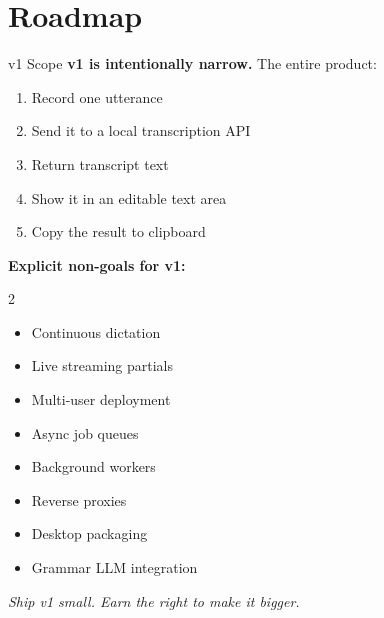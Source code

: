\documentclass{beamer}
\begin{document}
\section{Roadmap}

\begin{frame}{v1 Scope}
    \small
    \textbf{v1 is intentionally narrow.} The entire product:

    \vspace{0.3em}
    \begin{enumerate}\setlength{\itemsep}{0pt}
        \item Record one utterance
        \item Send it to a local transcription API
        \item Return transcript text
        \item Show it in an editable text area
        \item Copy the result to clipboard
    \end{enumerate}

    \vspace{0.2em}
    \textbf{Explicit non-goals for v1:}
    \begin{multicols}{2}
    \begin{itemize}\setlength{\itemsep}{0pt}
        \item Continuous dictation
        \item Live streaming partials
        \item Multi-user deployment
        \item Async job queues
        \item Background workers
        \item Reverse proxies
        \item Desktop packaging
        \item Grammar LLM integration
    \end{itemize}
    \end{multicols}

    \vspace{-0.2em}
    \begin{center}
    \textit{Ship v1 small. Earn the right to make it bigger.}
    \end{center}
\end{frame}
\end{document}
